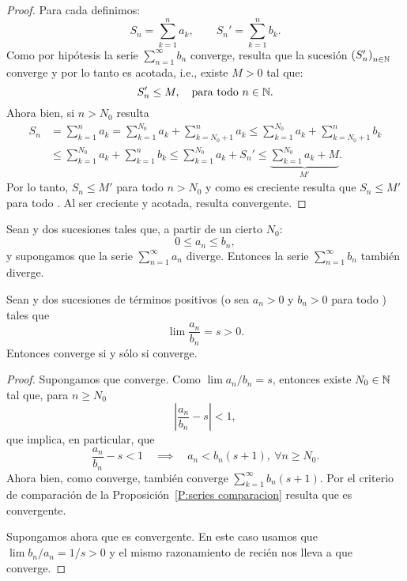 \begin{proof}
    Para cada \niN definimos:
    \[
    S_n = \sum_{k=1}^n a_k,
    \qquad
    S_n' = \sum_{k=1}^n b_k.
    \]
    Como por hipótesis la serie $\sum_{n=1}^\infty b_n$ converge, resulta que la sucesión $\left(S_n'\right)_{n\in\mathbb{N}}$ converge y por lo tanto es acotada, i.e., existe $M > 0$ tal que:
    \[
    S_n' \le M, \quad\text{para todo {\ensuremath{n\in\mathbb{N}}}}.
    \]
    Ahora bien, si $n>N_0$ resulta
    \begin{align*}
        S_n &= \sum_{k=1}^n a_k 
        = \sum_{k=1}^{N_0} a_k + \sum_{k=N_0+1}^n a_k
        \le \sum_{k=1}^{N_0} a_k + \sum_{k=N_0+1}^n b_k
        \\
        &\le \sum_{k=1}^{N_0} a_k + \sum_{k=1}^n b_k
        \le \sum_{k=1}^{N_0} a_k + S_n'
        \le \underbrace{\sum_{k=1}^{N_0} a_k + M}_{M'}.
    \end{align*}
    Por lo tanto, $S_n \le M'$ para todo $n > N_0$ y como \sucSn es creciente
    resulta que $S_n \le M'$ para todo \niN. 
    Al ser \sucSn creciente y acotada, resulta convergente.
\end{proof}

\begin{corollary}
Sean \sucan y \sucbn dos sucesiones tales que, a partir de un cierto $N_0$:
   \[
   0 \le a_n \le b_n,
   \]
   y supongamos que la serie $\sum_{n=1}^\infty a_n$ diverge. Entonces la serie $\sum_{n=1}^\infty b_n$ también diverge.
\end{corollary}

\begin{corollary}
Sean \sucan y \sucbn dos sucesiones de términos positivos (o sea $a_n>0$ y $b_n>0$ para todo \niN) tales que
\[
\lim \frac{a_n}{b_n} = s > 0.
\]
Entonces \seriean converge si y sólo si \seriebn converge.
\end{corollary}

\begin{proof}
    Supongamos que \seriebn converge. Como $\lim a_n/b_n = s$, entonces existe $N_0\in\mathbb{N}$ tal que, para $n\ge N_0$
    \[
    \left| \frac{a_n}{b_n} - s \right| < 1,
    \]
    que implica, en particular, que 
    \[
    \frac{a_n}{b_n} - s < 1 \quad\implies\quad a_n < b_n (s+1), \ \forall n\ge N_0.
    \]
    Ahora bien, como \seriebn converge, también converge $\sum_{k=1}^\infty b_n(s+1)$.
    Por el criterio de comparación de la Proposición~\ref{P:series comparacion} resulta que \seriean es convergente.

    Supongamos ahora que \seriean es convergente. En este caso usamos que $\lim b_n/a_n = 1/s > 0$ y el mismo razonamiento de recién nos lleva a que \seriebn converge.
\end{proof}

